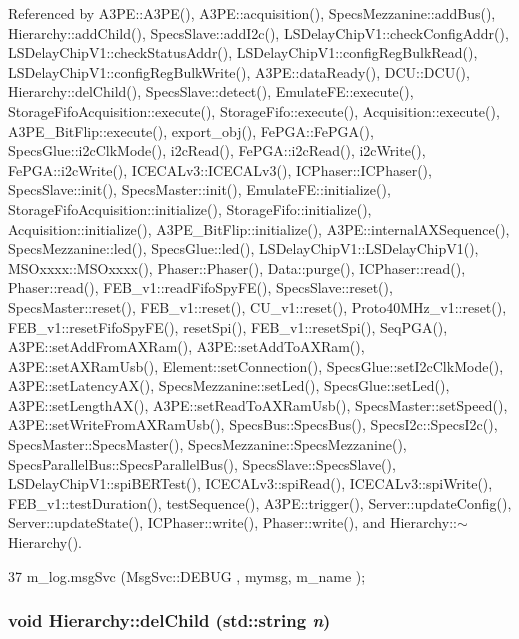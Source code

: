 Referenced by A3PE::A3PE(), A3PE::acquisition(), SpecsMezzanine::addBus(), Hierarchy::addChild(), SpecsSlave::addI2c(), LSDelayChipV1::checkConfigAddr(), LSDelayChipV1::checkStatusAddr(), LSDelayChipV1::configRegBulkRead(), LSDelayChipV1::configRegBulkWrite(), A3PE::dataReady(), DCU::DCU(), Hierarchy::delChild(), SpecsSlave::detect(), EmulateFE::execute(), StorageFifoAcquisition::execute(), StorageFifo::execute(), Acquisition::execute(), A3PE\_\-BitFlip::execute(), export\_\-obj(), FePGA::FePGA(), SpecsGlue::i2cClkMode(), i2cRead(), FePGA::i2cRead(), i2cWrite(), FePGA::i2cWrite(), ICECALv3::ICECALv3(), ICPhaser::ICPhaser(), SpecsSlave::init(), SpecsMaster::init(), EmulateFE::initialize(), StorageFifoAcquisition::initialize(), StorageFifo::initialize(), Acquisition::initialize(), A3PE\_\-BitFlip::initialize(), A3PE::internalAXSequence(), SpecsMezzanine::led(), SpecsGlue::led(), LSDelayChipV1::LSDelayChipV1(), MSOxxxx::MSOxxxx(), Phaser::Phaser(), Data::purge(), ICPhaser::read(), Phaser::read(), FEB\_\-v1::readFifoSpyFE(), SpecsSlave::reset(), SpecsMaster::reset(), FEB\_\-v1::reset(), CU\_\-v1::reset(), Proto40MHz\_\-v1::reset(), FEB\_\-v1::resetFifoSpyFE(), resetSpi(), FEB\_\-v1::resetSpi(), SeqPGA(), A3PE::setAddFromAXRam(), A3PE::setAddToAXRam(), A3PE::setAXRamUsb(), Element::setConnection(), SpecsGlue::setI2cClkMode(), A3PE::setLatencyAX(), SpecsMezzanine::setLed(), SpecsGlue::setLed(), A3PE::setLengthAX(), A3PE::setReadToAXRamUsb(), SpecsMaster::setSpeed(), A3PE::setWriteFromAXRamUsb(), SpecsBus::SpecsBus(), SpecsI2c::SpecsI2c(), SpecsMaster::SpecsMaster(), SpecsMezzanine::SpecsMezzanine(), SpecsParallelBus::SpecsParallelBus(), SpecsSlave::SpecsSlave(), LSDelayChipV1::spiBERTest(), ICECALv3::spiRead(), ICECALv3::spiWrite(), FEB\_\-v1::testDuration(), testSequence(), A3PE::trigger(), Server::updateConfig(), Server::updateState(), ICPhaser::write(), Phaser::write(), and Hierarchy::$\sim$Hierarchy().


\begin{DoxyCode}
37 { m_log.msgSvc (MsgSvc::DEBUG   , mymsg, m_name ); }
\end{DoxyCode}
\hypertarget{classHierarchy_a1928ac7615fe0b5e55cd707f70dc6781}{
\subsubsection[{delChild}]{\setlength{\rightskip}{0pt plus 5cm}void Hierarchy::delChild (std::string {\em n})}}
\label{classHierarchy_a1928ac7615fe0b5e55cd707f70dc6781}


